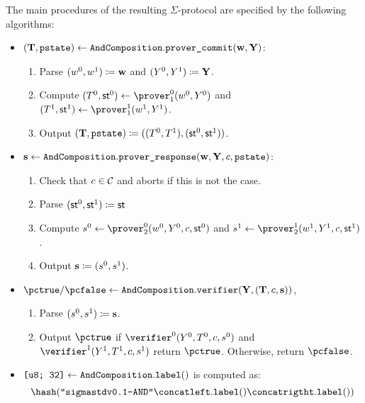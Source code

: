 \documentclass[runningheads,11pt]{article}
\begin{document}
The main procedures of the resulting $\Sigma$-protocol are specified by the following algorithms:
\begin{itemize}
  \item
  $(\mathbf {T}, \texttt{pstate})\gets \texttt{AndComposition}.\texttt{prover\_commit}(\mathbf {w}, \mathbf {Y})$:
    \begin{enumerate}
      \item
        Parse $(w^0,w^1)\coloneqq \mathbf {w}$ and $(Y^0,Y^1)\coloneqq \mathbf {Y}$.
      \item
        Compute $(\commitment^0,\st^0)\gets\prover_1^0(\witness^0, \statement^0)$ and $(\commitment^1,\st^1)\gets\prover_1^1(\witness^1, \statement^1)$.
      \item
	Output $(\mathbf {T},\texttt{pstate}) \coloneqq ((T^0,  T^1),(\mathsf{st}^0,\mathsf{st}^1))$.
    \end{enumerate}
  \item
  $\mathbf {s} \gets \texttt{AndComposition}.\texttt{prover\_response}(\mathbf {w}, \mathbf {Y}, c, \texttt{pstate})$:
    \begin{enumerate}
      \item
        Check that $c\in\mathcal{C}$ and aborts if this is not the case.
      \item
	Parse $(\mathsf{st}^0,\mathsf{st}^1)\coloneqq \mathsf{st}$
      \item
        Compute $\response^0\gets\prover_2^0(\witness^0,\statement^0,\challenge,\st^0)$ and $\response^1\gets\prover_2^1(\witness^1,\statement^1,\challenge,\st^1)$.
      \item
        Output $\mathbf {s}\coloneqq(s^0,s^1)$.
    \end{enumerate}
  \item
  $\accept/\reject \gets \andcomposition.\verifiertt(\vec \statement, (\vec \commitment, \challenge, \vec \response))$,
  \begin{enumerate}
      \item
        Parse $(s^0,s^1)\coloneqq \mathbf {s}$.
      \item
	Output $\accept$ if $\verifier^0(\statement^0, \commitment^0,\challenge, \response^0)$ and $\verifier^1(\statement^1, \commitment^1,\challenge, \response^1)$ return $\accept$. Otherwise, return $\reject$.
    \end{enumerate}
  \item  $\texttt{[u8; 32]} \gets \texttt{AndComposition}.\texttt{label}()$ is computed as:
    \[
     \hash(\texttt{''sigmastdv0.1-AND''} \concat \firstprover.\labeltt() \concat \secondprover.\labeltt())
\]
\end{itemize}
\end{document}
